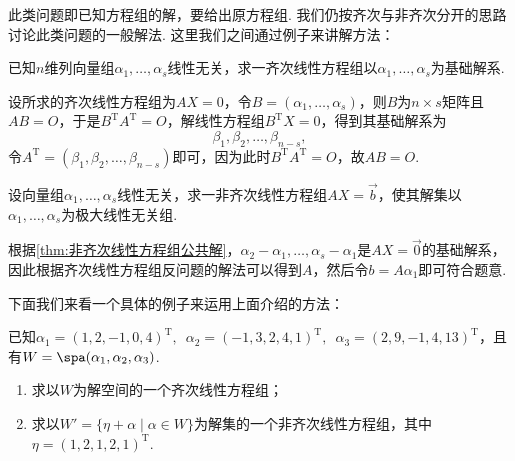 此类问题即已知方程组的解，要给出原方程组. 我们仍按齐次与非齐次分开的思路讨论此类问题的一般解法. 这里我们之间通过例子来讲解方法：
\begin{example}{}{}
    已知$n$维列向量组$\alpha_1,\ldots,\alpha_s$线性无关，求一齐次线性方程组以$\alpha_1,\ldots,\alpha_s$为基础解系.
\end{example}

\begin{solution}
    设所求的齐次线性方程组为$AX=0$，令$B=(\alpha_1,\ldots,\alpha_s)$，则$B$为$n\times s$矩阵且$AB=O$，于是$B^\mathrm{T}A^\mathrm{T}=O$，解线性方程组$B^\mathrm{T}X=0$，得到其基础解系为
    \[\beta_1,\beta_2,\ldots,\beta_{n-s},\]
    令$A^\mathrm{T}=(\beta_1,\beta_2,\ldots,\beta_{n-s})$即可，因为此时$B^\mathrm{T}A^\mathrm{T}=O$，故$AB=O$.
\end{solution}

\begin{example}{}{}
    设向量组$\alpha_1,\ldots,\alpha_s$线性无关，求一非齐次线性方程组$AX=\vec{b}$，使其解集以$\alpha_1,\ldots,\alpha_s$为极大线性无关组.
\end{example}

\begin{solution}
    根据\autoref{thm:非齐次线性方程组公共解}，$\alpha_2-\alpha_1,\ldots,\alpha_s-\alpha_1$是$AX=\vec{0}$的基础解系，因此根据齐次线性方程组反问题的解法可以得到$A$，然后令$b=A\alpha_1$即可符合题意.
\end{solution}

下面我们来看一个具体的例子来运用上面介绍的方法：
\begin{example}{}{}
    已知$\alpha_1=(1,2,-1,0,4)^\mathrm{T},\enspace\alpha_2=(-1,3,2,4,1)^\mathrm{T},\enspace\alpha_3=(2,9,-1,4,13)^\mathrm{T}$，且有$W=\spa(\alpha_1,\alpha_2,\alpha_3)$.
    \begin{enumerate}
        \item 求以$W$为解空间的一个齐次线性方程组；

        \item 求以$W'=\{\eta+\alpha \mid \alpha\in W\}$为解集的一个非齐次线性方程组，其中$\eta=(1,2,1,2,1)^\mathrm{T}$.
    \end{enumerate}
\end{example}

